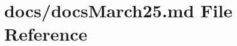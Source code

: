 \hypertarget{docs_march25_8md}{}\section{docs/docs\+March25.md File Reference}
\label{docs_march25_8md}
